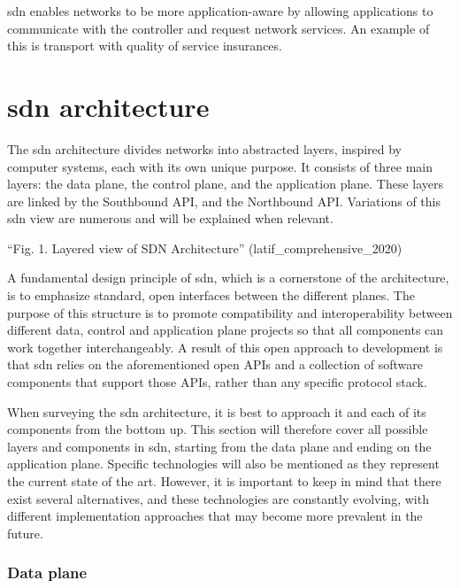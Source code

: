 \gls{sdn} enables networks to be more application-aware by allowing applications to communicate with the controller and request network services. An example of this is transport with quality of service insurances. \cite{thyagaturu_software_2016}


\section[SDN architecture]{\gls{sdn} architecture} %

The \gls{sdn} architecture divides networks into abstracted layers, inspired by computer systems, each with its own unique purpose\cite{kreutz_software-defined_2015}. It consists of three main layers: the data plane, the control plane, and the application plane. These layers are linked by the Southbound API, and the Northbound API. Variations of this \gls{sdn} view are numerous and will be explained when relevant.

“Fig. 1. Layered view of SDN Architecture” (latif_comprehensive_2020)

A fundamental design principle of \gls{sdn}, which is a cornerstone of the architecture, is to emphasize standard, open interfaces between the different planes. The purpose of this structure is to promote compatibility and interoperability between different data, control and application plane projects so that all components can work together interchangeably\cite{kreutz_software-defined_2015}. A result of this open approach to development is that \gls{sdn} relies on the aforementioned open APIs and a collection of software components that support those APIs, rather than any specific protocol stack\cite{peterson_software-defined_2021}. 

When surveying the \gls{sdn} architecture, it is best to approach it and each of its components from the bottom up. This section will therefore cover all possible layers and components in \gls{sdn}, starting from the data plane and ending on the application plane. Specific technologies will also be mentioned as they represent the current state of the art. However, it is important to keep in mind that there exist several alternatives, and these technologies are constantly evolving, with different implementation approaches that may become more prevalent in the future. \cite{peterson_software-defined_2021}



\subsubsection{Data plane} %

